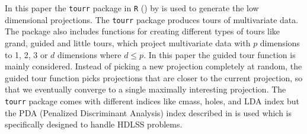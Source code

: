 In this paper the \texttt{tourr} package in \texttt{R} (\cite{r}) by \cite{WC08} is used to generate the low dimensional projections. The \texttt{tourr} package produces tours of multivariate data. The package also includes functions for creating different types of tours like grand, guided and little tours, which project multivariate data with $p$ dimensions to 1, 2, 3 or $d$ dimensions where $d \le p$. In this paper the guided tour function is mainly considered. Instead of picking a new projection completely at random, the guided tour function picks projections that are closer to the current projection, so that we eventually converge to a single maximally interesting projection. The \texttt{tourr} package comes with different indices like cmass, holes, and LDA index but the PDA (Penalized Discriminant Analysis)  index described in \cite{lee:2009} is used which is specifically designed to handle HDLSS problems. \\     


%
%

